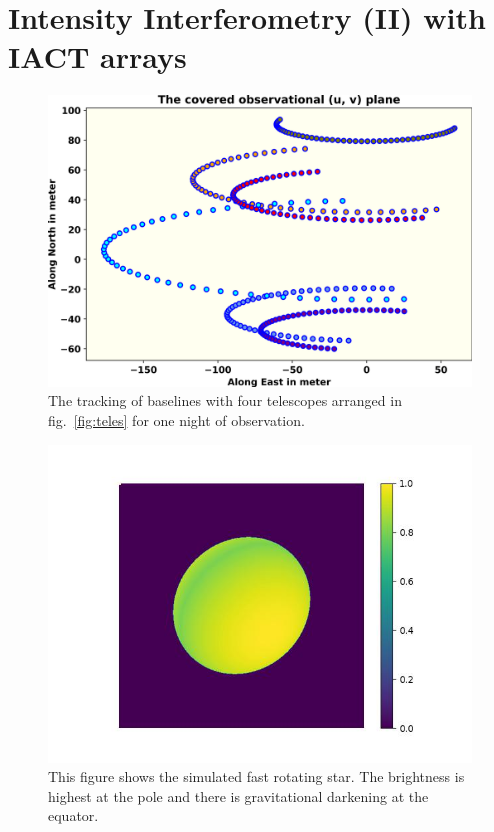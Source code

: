 \section{Intensity Interferometry (II) with IACT arrays}
\begin{figure}
	\centering
	\includegraphics[width=\linewidth]{fig/baseline.png}
	\caption{The tracking of baselines with four telescopes arranged in fig.~\ref{fig:teles} for one night of observation.}
	\label{fig:base}
\end{figure}
\begin{figure}[hbt]
	\centering
	\includegraphics[width=\linewidth]{fig/ellipse/ellipse1612.jpg}
	\caption{This figure shows the simulated fast rotating star. The brightness is highest at the pole and there is gravitational darkening at the equator.}
	\label{fig:image}
\end{figure}
